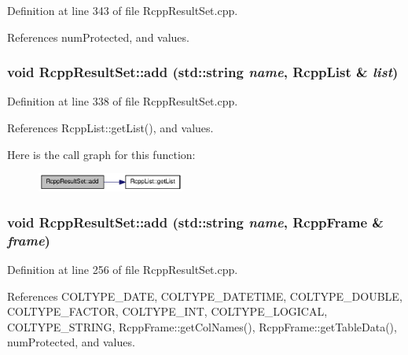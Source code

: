 Definition at line 343 of file RcppResultSet.cpp.

References numProtected, and values.\hypertarget{classRcppResultSet_a37b3d22adf1e47eec75ee664085daa59}{
\subsubsection[{add}]{\setlength{\rightskip}{0pt plus 5cm}void RcppResultSet::add (std::string {\em name}, \/  {\bf RcppList} \& {\em list})}}
\label{classRcppResultSet_a37b3d22adf1e47eec75ee664085daa59}


Definition at line 338 of file RcppResultSet.cpp.

References RcppList::getList(), and values.

Here is the call graph for this function:\nopagebreak
\begin{figure}[H]
\begin{center}
\leavevmode
\includegraphics[width=137pt]{classRcppResultSet_a37b3d22adf1e47eec75ee664085daa59_cgraph}
\end{center}
\end{figure}
\hypertarget{classRcppResultSet_a9e05fb2ca92258529ffbb536e23a2a4d}{
\subsubsection[{add}]{\setlength{\rightskip}{0pt plus 5cm}void RcppResultSet::add (std::string {\em name}, \/  {\bf RcppFrame} \& {\em frame})}}
\label{classRcppResultSet_a9e05fb2ca92258529ffbb536e23a2a4d}


Definition at line 256 of file RcppResultSet.cpp.

References COLTYPE\_\-DATE, COLTYPE\_\-DATETIME, COLTYPE\_\-DOUBLE, COLTYPE\_\-FACTOR, COLTYPE\_\-INT, COLTYPE\_\-LOGICAL, COLTYPE\_\-STRING, RcppFrame::getColNames(), RcppFrame::getTableData(), numProtected, and values.

